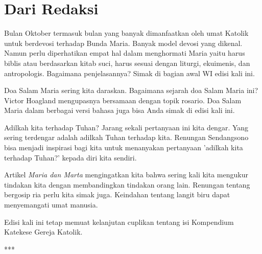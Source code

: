 \newpage

\section*{\center Dari Redaksi}


Bulan Oktober termasuk bulan yang banyak dimanfaatkan oleh umat Katolik untuk berdevosi terhadap Bunda Maria. Banyak model devosi yang dikenal. Namun perlu diperhatikan empat hal dalam menghormati Maria yaitu harus biblis atau berdasarkan kitab suci, harus sesuai dengan liturgi, ekuimenis, dan antropologis. Bagaimana penjelasannya? Simak di bagian awal WI edisi kali ini.

Doa Salam Maria sering kita daraskan. Bagaimana sejarah doa Salam Maria ini? Victor Hoagland mengupasnya bersamaan dengan topik rosario. Doa Salam Maria dalam berbagai versi bahasa juga bisa Anda simak di edisi kali ini.

Adilkah kita terhadap Tuhan? Jarang sekali pertanyaan ini kita dengar. Yang sering terdengar adalah adilkah Tuhan terhadap kita. Renungan Sendangsono bisa menjadi inspirasi bagi kita untuk menanyakan pertanyaan 'adilkah kita terhadap Tuhan?' kepada diri kita sendiri. 

Artikel \textit{Maria dan Marta} mengingatkan kita bahwa sering kali kita mengukur tindakan kita dengan membandingkan tindakan orang lain. Renungan tentang bergosip ria perlu kita simak juga. Keindahan tentang langit biru dapat menyemangati umat manusia. 

Edisi kali ini tetap memuat kelanjutan cuplikan tentang isi Kompendium Katekese Gereja Katolik.

\begin{center}***\end{center} 

\vspace*{1.3cm}



